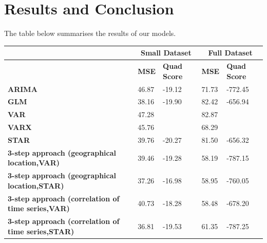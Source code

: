 \documentclass[nonblindrev,msom]{informs3} %
\begin{document}
\newpage
\section{Results and Conclusion}
The table below summarises the results of our models. 

\begin{table}[H]
\begin{tabular}{|l|l|l|l|l|}
\hline
                                                                      & \multicolumn{2}{c|}{\textbf{Small Dataset}} & \multicolumn{2}{c|}{\textbf{Full Dataset}} \\ \hline
                                                                      & \textbf{MSE}      & \textbf{Quad Score}     & \textbf{MSE}     & \textbf{Quad Score}     \\ \hline
\textbf{ARIMA}                                                        & 46.87             &      -19.12                   & 71.73            &                        -772.45 \\ \hline
\textbf{GLM}                                                          & 38.16             & -19.90                  & 82.42            & -656.94                 \\ \hline
\textbf{VAR}                                                          & 47.28             &                         & 82.87            &                         \\ \hline
\textbf{VARX}                                                         & 45.76             &                         & 68.29            &                         \\ \hline
\textbf{STAR}                                                         & 39.76             & -20.27                  & 81.50            & -656.32                 \\ \hline
\textbf{3-step approach (geographical location,VAR)}      & 39.46 &                        -19.28 & 58.19            & -787.15                 \\ \hline
\textbf{3-step approach (geographical location,STAR)}      & 37.26 &                        -16.98 & 58.95            & -760.05             \\ \hline
\textbf{3-step approach (correlation of time series,VAR)} & 40.73             &      -18.28                  & 58.48           & -678.20                 \\ \hline
\textbf{3-step approach (correlation of time series,STAR)} & 36.81 &      -19.53                 & 61.35           & -787.25              \\ \hline

\end{tabular}
\end{table}
\end{document}
